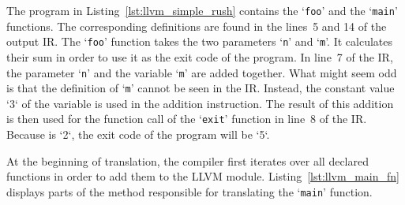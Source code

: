 \noindent
\begin{minipage}{.44\textwidth}
    \centering
\end{minipage}%
\hfill
\begin{minipage}{.44\textwidth}
    \centering
    \vspace{.1cm}
\end{minipage}

The program in Listing~\ref{lst:llvm_simple_rush} contains the `\texttt{foo}' and the `\texttt{main}' functions.
The corresponding definitions are found in the lines~5 and 14 of the output IR.
The `\texttt{foo}' function takes the two parameters `\texttt{n}' and `\texttt{m}'.
It calculates their sum in order to use it as the exit code of the program.
In line~7 of the IR, the parameter `\texttt{n}' and the variable `\texttt{m}' are added together.
What might seem odd is that the definition of `\texttt{m}' cannot be seen in the IR\@.
Instead, the constant value `3` of the variable is used in the addition instruction.
The result of this addition is then used for the function call of the `\texttt{exit}' function in line~8 of the IR\@.
Because  is `2`, the exit code of the program will be `5`.

At the beginning of translation, the compiler first iterates over all declared functions in order to add them to the LLVM module.
Listing~\ref{lst:llvm_main_fn} displays parts of the method responsible for translating the `\texttt{main}' function.


